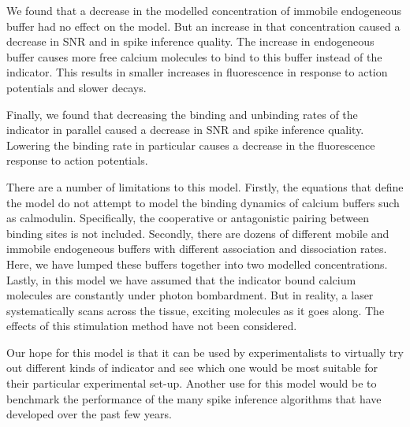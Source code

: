 \documentclass[a4paper,12pt]{article}
\theoremstyle{definition}
\begin{document}
We found that a decrease in the modelled concentration of immobile endogeneous buffer had no effect on the model. But an increase in that concentration caused a decrease in SNR and in spike inference quality. The increase in endogeneous buffer causes more free calcium molecules to bind to this buffer instead of the indicator. This results in smaller increases in fluorescence in response to action potentials and slower decays.

Finally, we found that decreasing the binding and unbinding rates of the indicator in parallel caused a decrease in SNR and spike inference quality. Lowering the binding rate in particular causes a decrease in the fluorescence response to action potentials.

There are a number of limitations to this model. Firstly, the equations that define the model do not attempt to model the binding dynamics of calcium buffers such as calmodulin. Specifically, the cooperative or antagonistic pairing between binding sites is not included. Secondly, there are dozens of different mobile and immobile endogeneous buffers with different association and dissociation rates. Here, we have lumped these buffers together into two modelled concentrations. Lastly, in this model we have assumed that the indicator bound calcium molecules are constantly under photon bombardment. But in reality, a laser systematically scans across the tissue, exciting molecules as it goes along. The effects of this stimulation method have not been considered.

Our hope for this model is that it can be used by experimentalists to virtually try out different kinds of indicator and see which one would be most suitable for their particular experimental set-up. Another use for this model would be to benchmark the performance of the many spike inference algorithms that have developed over the past few years.




\newpage


\end{document}

